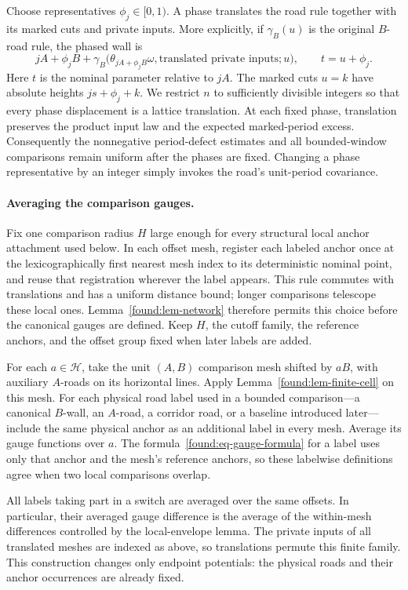Choose representatives $\phi_j\in[0,1)$.  A phase translates the road
rule together with its marked cuts and private inputs.  More explicitly,
if $\gamma_B(u)$ is the original $B$-road rule, the phased wall is
\[
 jA+\phi_jB+
 \gamma_B\bigl(\theta_{jA+\phi_jB}\omega,
                 \text{translated private inputs};u\bigr),
 \qquad t=u+\phi_j.
\]
Here $t$ is the nominal parameter relative to $jA$.  The marked cuts
$u=k$ have absolute heights $js+\phi_j+k$.  We restrict $n$ to
sufficiently divisible integers so that every phase displacement is a
lattice translation.  At each fixed phase, translation preserves the
product input law and the expected marked-period excess.  Consequently
the nonnegative period-defect estimates and all bounded-window
comparisons remain uniform after the phases are fixed.  Changing a phase
representative by an integer simply invokes the road's unit-period
covariance.

\paragraph{Averaging the comparison gauges.}
Fix one comparison radius $H$ large enough for every structural local
anchor attachment used below. In each offset mesh, register each labeled
anchor once at the lexicographically first nearest mesh index to its
deterministic nominal point, and reuse that registration wherever the
label appears. This rule commutes with translations and has a uniform
distance bound; longer comparisons telescope these local ones.
Lemma~\ref{found:lem-network} therefore permits this
choice before the canonical gauges are defined. Keep $H$, the cutoff
family, the reference anchors, and the offset group fixed when later
labels are added.

For each $a\in\mathcal H$, take the unit $(A,B)$ comparison mesh shifted
by $aB$, with auxiliary $A$-roads on its horizontal lines.  Apply
Lemma~\ref{found:lem-finite-cell} on this mesh. For each physical road
label used in a bounded comparison---a canonical $B$-wall, an $A$-road,
a corridor road, or a baseline introduced later---include the same
physical anchor as an additional label in every mesh. Average its gauge
functions over $a$. The formula~\eqref{found:eq-gauge-formula} for a
label uses only that anchor and the mesh's reference anchors, so these
labelwise definitions agree when two local comparisons overlap.

All labels taking part in a switch are averaged over the same offsets.
In particular, their averaged gauge difference is the average of the
within-mesh differences controlled by the local-envelope lemma. The
private inputs of all translated meshes are indexed as above, so
translations permute this finite family. This construction changes
only endpoint potentials: the physical roads and their anchor
occurrences are already fixed.

